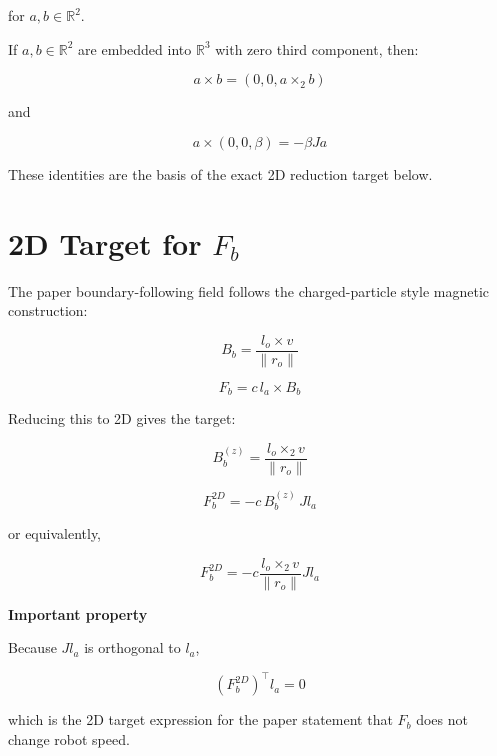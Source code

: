 \documentclass[11pt]{article}
\begin{document}
for \(a,b \in \mathbb{R}^2\).

If \(a,b \in \mathbb{R}^2\) are embedded into \(\mathbb{R}^3\) with zero
third component, then:

\begin{equation}
a \times b = (0,0,a \times_2 b)
\end{equation}

and

\begin{equation}
a \times (0,0,\beta) = -\beta J a
\end{equation}

These identities are the basis of the exact 2D reduction target below.

\section*{2D Target for \(F_b\)}

The paper boundary-following field follows the charged-particle style magnetic
construction:

\begin{equation}
B_b = \frac{l_o \times v}{\lVert r_o \rVert}
\end{equation}

\begin{equation}
F_b = c \, l_a \times B_b
\end{equation}

Reducing this to 2D gives the target:

\begin{equation}
B_b^{(z)} = \frac{l_o \times_2 v}{\lVert r_o \rVert}
\end{equation}

\begin{equation}
F_b^{2D} = -c \, B_b^{(z)} \, J l_a
\end{equation}

or equivalently,

\begin{equation}
F_b^{2D}
=
-c
\frac{l_o \times_2 v}{\lVert r_o \rVert}
J l_a
\end{equation}

\textbf{Important property}

Because \(J l_a\) is orthogonal to \(l_a\),

\begin{equation}
(F_b^{2D})^\top l_a = 0
\end{equation}

which is the 2D target expression for the paper statement that \(F_b\) does not
change robot speed.
\end{document}
